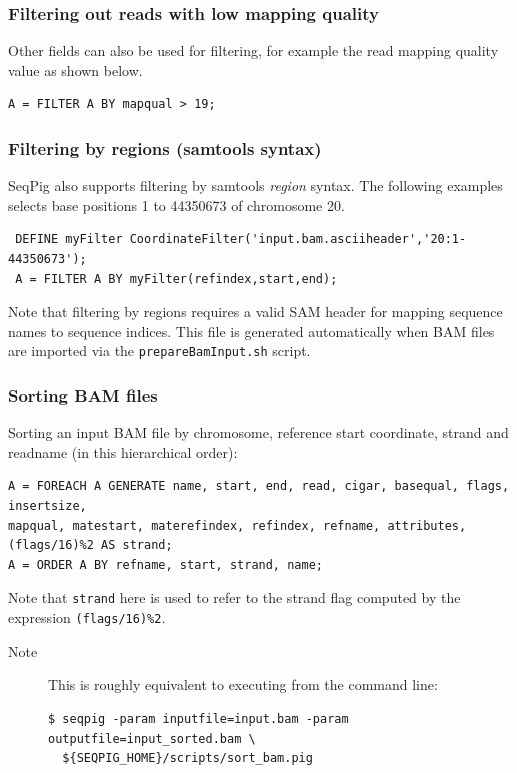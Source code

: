\subsubsection{Filtering out reads with low mapping quality}

Other fields can also be used for filtering, for example the read
mapping quality value as shown below.
\begin{lstlisting}
A = FILTER A BY mapqual > 19;
\end{lstlisting}

\subsubsection{Filtering by regions (samtools syntax)}

\label{subsubsect:regionfiltering}

SeqPig also supports filtering by samtools \emph{region} syntax.
The following examples selects base positions 1 to 44350673
of chromosome 20.
\begin{lstlisting}
 DEFINE myFilter CoordinateFilter('input.bam.asciiheader','20:1-44350673');
 A = FILTER A BY myFilter(refindex,start,end);
\end{lstlisting}
Note that filtering by regions requires a valid SAM header for mapping
sequence names to sequence indices. This file is generated automatically
when BAM files are imported via the {\tt prepareBamInput.sh} script.

\subsubsection{Sorting BAM files}
Sorting an input BAM file by chromosome, reference start coordinate, strand
and readname (in this hierarchical order):
\begin{lstlisting}
A = FOREACH A GENERATE name, start, end, read, cigar, basequal, flags, insertsize,
mapqual, matestart, materefindex, refindex, refname, attributes, (flags/16)%2 AS strand;
A = ORDER A BY refname, start, strand, name;
\end{lstlisting}
Note that {\tt strand} here is used to refer to the strand flag computed by the expression
{\tt (flags/16)\%2}.
\begin{description}
	\item[Note] This is roughly equivalent to executing from the command line:
\begin{lstlisting}
$ seqpig -param inputfile=input.bam -param outputfile=input_sorted.bam \
  ${SEQPIG_HOME}/scripts/sort_bam.pig
\end{lstlisting}
\end{description}


